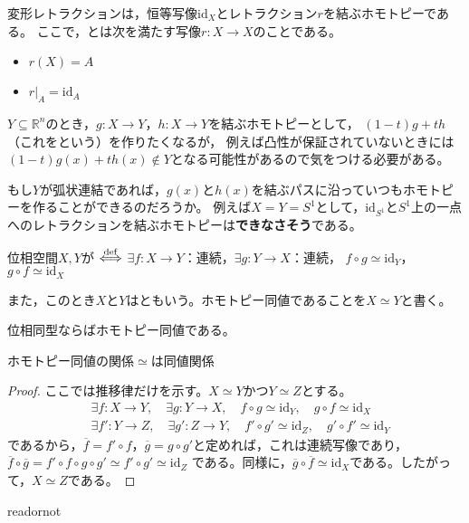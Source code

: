 \documentclass[uplatex]{jsarticle}
\renewcommand{\restriction}[2]{\left. #1 \right|_{#2}}
\begin{document}
\sukima {} 変形レトラクションは，恒等写像$\mathrm{id}_{X}$とレトラクション$r$を結ぶホモトピーである。
ここで，とは次を満たす写像$r \colon X \longrightarrow X$のことである。
\begin{itemize}
  \vspace{-0.5\baselineskip}
  \item $r(X) = A$
  \item $\restriction{r}{A} = \mathrm{id}_{A}$
\end{itemize}

\sukima {} $Y \subseteq \mathbb{R}^{n}$のとき，$g \colon X \longrightarrow Y$，$h \colon X \longrightarrow Y$を結ぶホモトピーとして，
$(1-t)g+th$（これをという）を作りたくなるが，
例えば凸性が保証されていないときには$(1-t)g(x) + t h(x) \notin Y$となる可能性があるので気をつける必要がある。

\sukima {} もし$Y$が弧状連結であれば，$g(x)$と$h(x)$を結ぶパスに沿っていつもホモトピーを作ることができるのだろうか。
例えば$X = Y = S^{1}$として，$\mathrm{id}_{S^{1}}$と$S^{1}$上の一点へのレトラクションを結ぶホモトピーは{\bf できなさそう}である。

\sukima {}

\begin{teigi}[ホモトピー同値]
  位相空間$X,Y$が $\overset{\mathrm{def}}{\Longleftrightarrow}$ $\exists f \colon X \longrightarrow Y$：連続，$\exists g \colon Y \longrightarrow X$：連続，
  $f \circ g \simeq \mathrm{id}_{Y}$，$g \circ f \simeq \mathrm{id}_{X}$

  また，このとき$X$と$Y$はともいう。ホモトピー同値であることを$X \simeq Y$と書く。
\end{teigi}

 位相同型ならばホモトピー同値である。

\begin{hodai}
  ホモトピー同値の関係$\simeq$は同値関係
\end{hodai}

\begin{proof}
  ここでは推移律だけを示す。$X \simeq Y$かつ$Y \simeq Z$とする。
  \begin{align}
    &\exists f \colon X \longrightarrow Y, \quad \exists g \colon Y \longrightarrow X, \quad f \circ g \simeq \mathrm{id}_{Y}, \quad g \circ f \simeq \mathrm{id}_{X} \\
    &\exists f' \colon Y \longrightarrow Z, \quad \exists g' \colon Z \longrightarrow Y, \quad f' \circ g' \simeq \mathrm{id}_{Z}, \quad g' \circ f' \simeq \mathrm{id}_{Y}
  \end{align}
  であるから，$\overline{f} = f' \circ f$，$\overline{g} = g \circ g'$と定めれば，これは連続写像であり，
  $\overline{f} \circ \overline{g} = f' \circ f \circ g \circ g' \simeq f' \circ g' \simeq \mathrm{id}_{Z}$
  である。同様に，$\overline{g} \circ \overline{f} \simeq \mathrm{id}_{X}$である。したがって，$X \simeq Z$である。
\end{proof}

\expandafter\ifx\csname readornot\endcsname\relax
  
\end{document}

